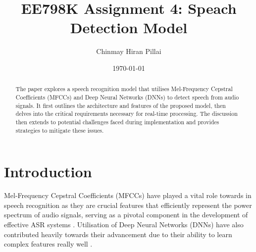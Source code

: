 \documentclass[%
 reprint,
 amsmath,amssymb,
 aps,
]{revtex4-2}
\begin{document}
\title{EE798K Assignment 4: Speach Detection Model}

\author{Chinmay Hiran Pillai}
\date{\today}%

\begin{abstract}
    The paper explores a speech recognition model that utilises Mel-Frequency Cepstral Coefficients (MFCCs)
    and Deep Neural Networks (DNNs) to detect speech from audio signals. It first outlines the architecture
    and features of the proposed model, then delves into the critical requirements necessary for real-time
    processing. The discussion then extends to potential challenges faced during implementation and provides
    strategies to mitigate these issues.
\end{abstract}

\maketitle


\section{Introduction}
Mel-Frequency Cepstral Coefficients (MFCCs) have played a vital role towards in speech recognition
as they are crucial features that efficiently represent the power spectrum of audio
signals, serving as a pivotal component in the development of effective ASR systems \cite{huang2001spoken}.
Utilisation of Deep Neural Networks (DNNs) have also contributed heavily towards their advancement due to
their ability to learn complex features really well \cite{hinton2012deep}. \\
\end{document}
